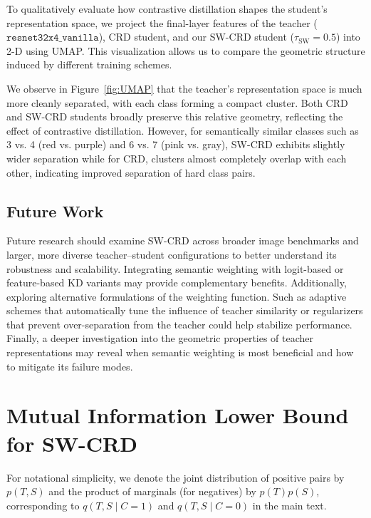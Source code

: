 \documentclass{article}
\theoremstyle{plain}
\theoremstyle{remark}
\begin{document}
To qualitatively evaluate how contrastive distillation shapes the student’s representation space, we project the final-layer features of the teacher ($\texttt{resnet32x4\_vanilla}$), CRD student, and our SW-CRD student ($\tau_{\text{SW}}=0.5$) into 2-D using UMAP. This visualization allows us to compare the geometric structure induced by different training schemes.

We observe in Figure~\ref{fig:UMAP} that the teacher’s representation space is much more cleanly separated, with each class forming a compact cluster. Both CRD and SW-CRD students broadly preserve this relative geometry, reflecting the effect of contrastive distillation. However, for semantically similar classes such as 3 vs. 4 (red vs. purple) and 6 vs. 7 (pink vs. gray), SW-CRD exhibits slightly wider separation while for CRD, clusters almost completely overlap with each other, indicating improved separation of hard class pairs.

\subsection{Future Work}

Future research should examine SW-CRD across broader image benchmarks and larger, more diverse teacher–student configurations to better understand its robustness and scalability. Integrating semantic weighting with logit-based or feature-based KD variants may provide complementary benefits. Additionally, exploring alternative formulations of the weighting function. Such as adaptive schemes that automatically tune the influence of teacher similarity or regularizers that prevent over-separation from the teacher could help stabilize performance. Finally, a deeper investigation into the geometric properties of teacher representations may reveal when semantic weighting is most beneficial and how to mitigate its failure modes.

\clearpage




\appendix

\section{Mutual Information Lower Bound for SW-CRD}
\label{app:mi-lower-bound}

For notational simplicity, we denote the joint distribution of positive pairs by $p(T,S)$ and the product of marginals (for negatives) by $p(T)p(S)$, corresponding to $q(T,S \mid C=1)$ and $q(T,S \mid C=0)$ in the main text.
\end{document}

